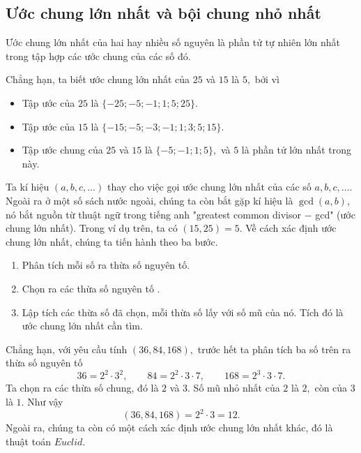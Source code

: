 \subsection{Ước chung lớn nhất và bội chung nhỏ nhất}
\begin{dx}
Ước chung lớn nhất của hai hay nhiều số nguyên là phần tử tự nhiên lớn nhất trong tập hợp các ước chung của các số đó.
\end{dx} 
Chẳng hạn, ta biết ước chung lớn nhất của $25$ và $15$ là $5,$ bởi vì
    \begin{itemize}
        \item Tập ước của $25$ là $\{-25;-5;-1;1;5;25\}.$
        \item Tập ước của $15$ là $\{-15;-5;-3;-1;1;3;5;15\}.$   
        \item Tập ước chung của $25$ và $15$ là $\{-5;-1;1;5\},$ và $5$ là phần tử lớn nhất trong này.
    \end{itemize}
Ta kí hiệu $(a,b,c,\ldots)$ thay cho việc gọi ước chung lớn nhất của các số $a,b,c,\ldots.$ Ngoài ra ở một số sách nước ngoài, chúng ta còn bắt gặp kí hiệu là $\gcd(a,b)$, nó bắt nguồn từ thuật ngữ trong tiếng anh "greatest common divisor $-$ gcd" (ước chung lớn nhất). Trong ví dụ trên, ta có $(15,25)=5.$ Về cách xác định ước chung lớn nhất, chúng ta tiến hành theo ba bước.
\begin{light}
\begin{enumerate}
    \item Phân tích mỗi số ra thừa số nguyên tố.
    \item Chọn ra các thừa số nguyên tố .
    \item Lập tích các thừa số đã chọn, mỗi thừa số lấy với số mũ  của nó. Tích đó là ước chung lớn nhất cần tìm.
\end{enumerate}
\end{light}
Chẳng hạn, với yêu cầu tính $(36,84,168),$ trước hết ta phân tích ba số trên ra thừa số nguyên tố
$$36 =2^{2} \cdot 3^{2},\qquad 84 =2^{2} \cdot 3 \cdot 7,\qquad 168 =2^{3} \cdot 3 \cdot 7.$$
Ta chọn ra các thừa số chung, đó là $2$ và $3$. Số mũ nhỏ nhất của $2$ là $2,$ còn của $3$ là $1.$ Như vậy
$$(36,84,168)=2^{2} \cdot 3=12.$$
Ngoài ra, chúng ta còn có một cách xác định ước chung lớn nhất khác, đó là thuật toán $Euclid.$ 


